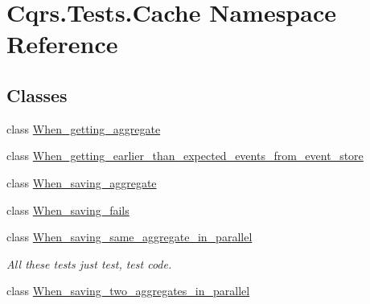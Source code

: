 \hypertarget{namespaceCqrs_1_1Tests_1_1Cache}{}\section{Cqrs.\+Tests.\+Cache Namespace Reference}
\label{namespaceCqrs_1_1Tests_1_1Cache}
\subsection*{Classes}
\begin{DoxyCompactItemize}
\item 
class \hyperlink{classCqrs_1_1Tests_1_1Cache_1_1When__getting__aggregate}{When\+\_\+getting\+\_\+aggregate}
\item 
class \hyperlink{classCqrs_1_1Tests_1_1Cache_1_1When__getting__earlier__than__expected__events__from__event__store}{When\+\_\+getting\+\_\+earlier\+\_\+than\+\_\+expected\+\_\+events\+\_\+from\+\_\+event\+\_\+store}
\item 
class \hyperlink{classCqrs_1_1Tests_1_1Cache_1_1When__saving__aggregate}{When\+\_\+saving\+\_\+aggregate}
\item 
class \hyperlink{classCqrs_1_1Tests_1_1Cache_1_1When__saving__fails}{When\+\_\+saving\+\_\+fails}
\item 
class \hyperlink{classCqrs_1_1Tests_1_1Cache_1_1When__saving__same__aggregate__in__parallel}{When\+\_\+saving\+\_\+same\+\_\+aggregate\+\_\+in\+\_\+parallel}
\begin{DoxyCompactList}\small\item\em All these tests just test, test code. \end{DoxyCompactList}\item 
class \hyperlink{classCqrs_1_1Tests_1_1Cache_1_1When__saving__two__aggregates__in__parallel}{When\+\_\+saving\+\_\+two\+\_\+aggregates\+\_\+in\+\_\+parallel}
\end{DoxyCompactItemize}
